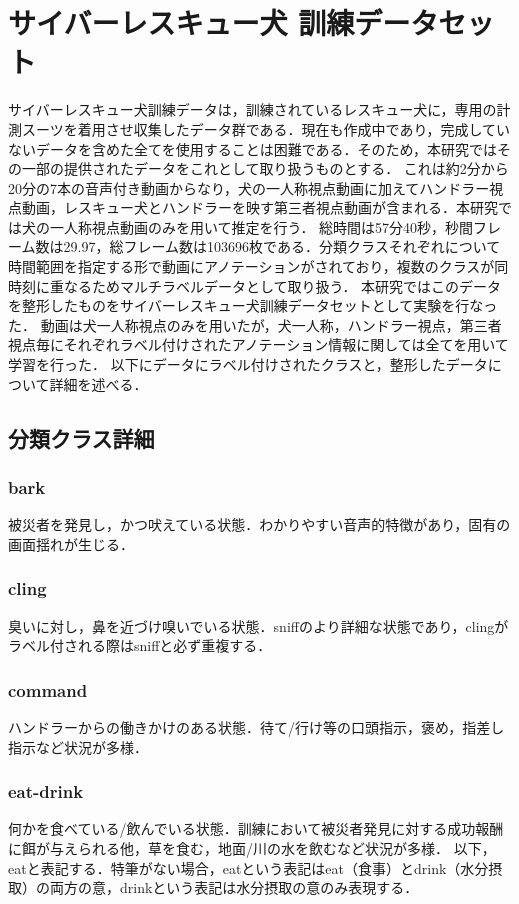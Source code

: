\section{サイバーレスキュー犬 訓練データセット}
サイバーレスキュー犬訓練データは，訓練されているレスキュー犬に，専用の計測スーツを着用させ収集したデータ群である．現在も作成中であり，完成していないデータを含めた全てを使用することは困難である．そのため，本研究ではその一部の提供されたデータをこれとして取り扱うものとする．
これは約2分から20分の7本の音声付き動画からなり，犬の一人称視点動画に加えてハンドラー視点動画，レスキュー犬とハンドラーを映す第三者視点動画が含まれる．本研究では犬の一人称視点動画のみを用いて推定を行う．
総時間は57分40秒，秒間フレーム数は29.97，総フレーム数は103696枚である．分類クラスそれぞれについて時間範囲を指定する形で動画にアノテーションがされており，複数のクラスが同時刻に重なるためマルチラベルデータとして取り扱う．
本研究ではこのデータを整形したものをサイバーレスキュー犬訓練データセットとして実験を行なった．
動画は犬一人称視点のみを用いたが，犬一人称，ハンドラー視点，第三者視点毎にそれぞれラベル付けされたアノテーション情報に関しては全てを用いて学習を行った．
以下にデータにラベル付けされたクラスと，整形したデータについて詳細を述べる．

\subsection{分類クラス詳細}
\subsubsection{bark}
被災者を発見し，かつ吠えている状態．わかりやすい音声的特徴があり，固有の画面揺れが生じる．
\subsubsection{cling}
臭いに対し，鼻を近づけ嗅いでいる状態．sniffのより詳細な状態であり，clingがラベル付される際はsniffと必ず重複する．
\subsubsection{command}
ハンドラーからの働きかけのある状態．待て/行け等の口頭指示，褒め，指差し指示など状況が多様．
\subsubsection{eat-drink}
何かを食べている/飲んでいる状態．訓練において被災者発見に対する成功報酬に餌が与えられる他，草を食む，地面/川の水を飲むなど状況が多様．
以下，eatと表記する．特筆がない場合，eatという表記はeat（食事）とdrink（水分摂取）の両方の意，drinkという表記は水分摂取の意のみ表現する．
